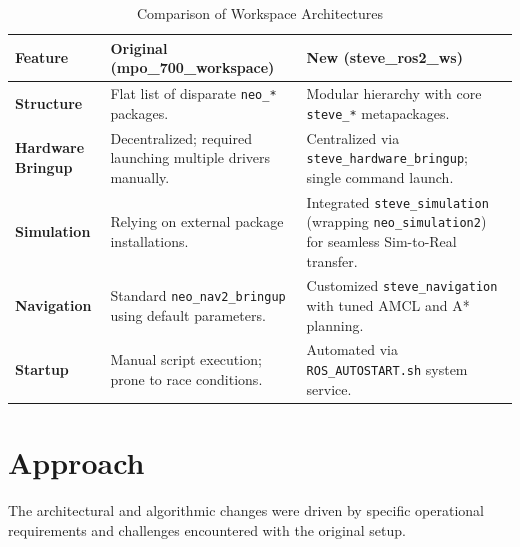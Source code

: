 \documentclass[12pt,oneside,a4paper]{article}
\begin{document}
\begin{table}[h]
    \caption{Comparison of Workspace Architectures}
    \label{tab:workspace_comparison}
    \centering
    \begin{tabularx}{\textwidth}{|l|X|X|}
        \hline
        \textbf{Feature} & \textbf{Original (mpo\_700\_workspace)} & \textbf{New (steve\_ros2\_ws)} \\
        \hline
        \textbf{Structure} & Flat list of disparate \texttt{neo\_*} packages. & Modular hierarchy with core \texttt{steve\_*} metapackages. \\
        \hline
        \textbf{Hardware Bringup} & Decentralized; required launching multiple drivers manually. & Centralized via \texttt{steve\_hardware\_bringup}; single command launch. \\
        \hline
        \textbf{Simulation} & Relying on external package installations. & Integrated \texttt{steve\_simulation} (wrapping \texttt{neo\_simulation2}) for seamless Sim-to-Real transfer. \\
        \hline
        \textbf{Navigation} & Standard \texttt{neo\_nav2\_bringup} using default parameters. & Customized \texttt{steve\_navigation} with tuned AMCL and A* planning. \\
        \hline
        \textbf{Startup} & Manual script execution; prone to race conditions. & Automated via \texttt{ROS\_AUTOSTART.sh} system service. \\
        \hline
    \end{tabularx}
\end{table}

\section{Approach}
\label{sec:approach}

The architectural and algorithmic changes were driven by specific operational requirements and challenges encountered with the original setup.
\end{document}
